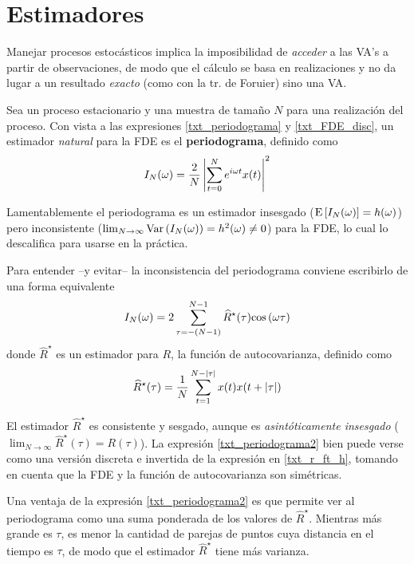 
\section{Estimadores}

Manejar 
procesos estocásticos implica la imposibilidad de \textit{acceder} a las VA's a partir de 
observaciones, de modo que el cálculo se basa en realizaciones y no da lugar a un resultado 
\textit{exacto} (como con la tr. de Foruier) sino una VA.

Sea \xt un proceso estacionario y \xtd una muestra de tamaño $N$ para una realización del proceso.
%
Con vista a las expresiones \ref{txt_periodograma} y \ref{txt_FDE_disc},
un estimador \textit{natural} para la FDE es el \textbf{periodograma}, definido como
\begin{equation}
I_N(\omega) = \frac{2}{N} \left| \sum_{t = 0}^{N} e^{i \omega t} x(t) \right|^{2}
\label{txt_periodograma}
\end{equation}

Lamentablemente el periodograma es un estimador 
insesgado ($\mathrm{E}\left[ I_N(\omega) \right]=h(\omega)$) pero 
inconsistente ($\lim_{N\rightarrow\infty} \mathrm{Var}\left( I_N(\omega) \right) = h^{2}(\omega) \neq 0$) para
la FDE, lo cual lo descalifica para usarse en la práctica.

Para entender --y evitar-- la inconsistencia del periodograma conviene escribirlo de una forma
equivalente
\begin{equation}
I_N(\omega) = 2 \sum_{\tau = -(N-1)}^{N-1} \widehat{R}^{\star}(\tau) \mathrm{cos}\left( \omega \tau \right)
\label{txt_periodograma2}
\end{equation}
%
donde $\widehat{R}^{\star}$ es un estimador para $R$, la función de autocovarianza, 
definido como
\begin{equation}
\widehat{R}^{\star} (\tau) = \frac{1}{N} \sum_{t = 1}^{N-\left| \tau \right|} x(t) x(t+\left| \tau \right|)
\end{equation}

El estimador $\widehat{R}^{\star}$ es consistente y sesgado, aunque
es \textit{asintóticamente insesgado} ($\lim_{N\rightarrow \infty} 
\widehat{R}^{\star}(\tau) = R(\tau)$).
%
La expresión \ref{txt_periodograma2} bien puede verse como una versión discreta e invertida de la 
expresión en \ref{txt_r_ft_h}, tomando en cuenta que la FDE y la función de autocovarianza son 
simétricas. 

Una ventaja de la expresión \ref{txt_periodograma2} es que permite ver al periodograma como 
una suma ponderada de los valores de $\widehat{R}^{\star}$. 
Mientras más grande es $\tau$, es menor la cantidad de parejas de puntos cuya distancia en el 
tiempo es $\tau$, de modo que el estimador $\widehat{R}^{\star}$ tiene más varianza. 

